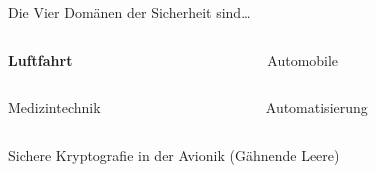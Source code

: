 
\begin{frame}{Die Vier Domänen der Sicherheit sind…}
  \Large
  \begin{columns}[c]
    \begin{column}{.5\linewidth}
      \textbf{Luftfahrt}
    \end{column}
    \begin{column}{.5\linewidth}
      Automobile
    \end{column}
  \end{columns}
  \vfill
  \begin{columns}[c]
    \begin{column}{.5\linewidth}
      Medizintechnik
    \end{column}
    \begin{column}{.5\linewidth}
      Automatisierung
    \end{column}
  \end{columns}
\end{frame}


\begin{frame}[c]{Sichere Kryptografie in der Avionik}
  \vspace{4em}
  \footnotesize
  (Gähnende Leere)
\end{frame}

